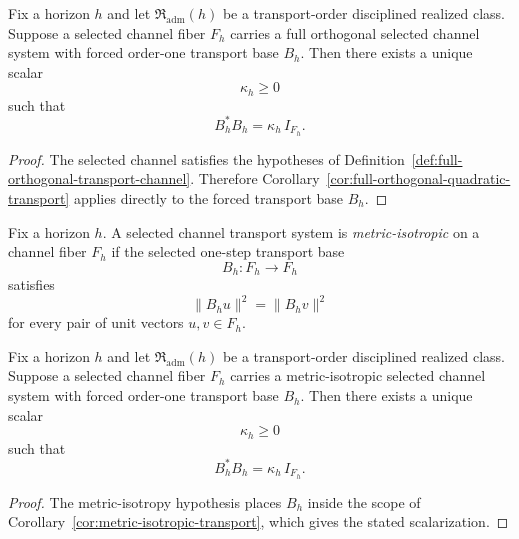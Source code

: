 \begin{corollary}
\label{cor:realized-full-orthogonal-quadratic-transport}
Fix a horizon $h$ and let $\mathfrak R_{\mathrm{adm}}(h)$ be a transport-order
disciplined realized class. Suppose a selected channel fiber $F_h$ carries a
full orthogonal selected channel system with forced order-one transport base
$B_h$. Then there exists a unique scalar
\[
\kappa_h\ge 0
\]
such that
\[
B_h^*B_h=\kappa_h\,I_{F_h}.
\]
\end{corollary}

\begin{proof}
The selected channel satisfies the hypotheses of
Definition~\ref{def:full-orthogonal-transport-channel}. Therefore
Corollary~\ref{cor:full-orthogonal-quadratic-transport} applies directly to
the forced transport base $B_h$.
\end{proof}

\begin{definition}
\label{def:metric-isotropic-selected-channel-system}
Fix a horizon $h$. A selected channel transport system is
\emph{metric-isotropic} on a channel fiber $F_h$ if the selected one-step
transport base
\[
B_h:F_h\to F_h
\]
satisfies
\[
\|B_hu\|^2=\|B_hv\|^2
\]
for every pair of unit vectors $u,v\in F_h$.
\end{definition}

\begin{corollary}
\label{cor:realized-metric-isotropic-quadratic-transport}
Fix a horizon $h$ and let $\mathfrak R_{\mathrm{adm}}(h)$ be a transport-order
disciplined realized class. Suppose a selected channel fiber $F_h$ carries a
metric-isotropic selected channel system with forced order-one transport base
$B_h$. Then there exists a unique scalar
\[
\kappa_h\ge 0
\]
such that
\[
B_h^*B_h=\kappa_h\,I_{F_h}.
\]
\end{corollary}

\begin{proof}
The metric-isotropy hypothesis places $B_h$ inside the scope of
Corollary~\ref{cor:metric-isotropic-transport}, which gives the stated
scalarization.
\end{proof}

